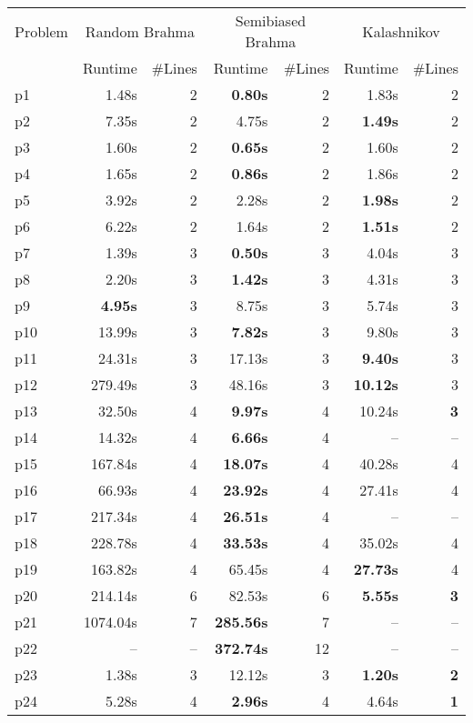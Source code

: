 \begin{tabular}{l||rr|rr|rr}
Problem & \multicolumn{2}{c}{Random {\sc Brahma}} & \multicolumn{2}{|c}{Semibiased {\sc Brahma}} & \multicolumn{2}{|c}{\sc Kalashnikov} \\
        & Runtime & \#Lines & Runtime & \#Lines & Runtime & \#Lines \\
\hline
\hline
p1 & 1.48s &2 &{\bf 0.80s} &2 &1.83s &2 \\
p2 & 7.35s &2 &4.75s &2 &{\bf 1.49s} &2 \\
p3 & 1.60s &2 &{\bf 0.65s} &2 &1.60s &2 \\
p4 & 1.65s &2 &{\bf 0.86s} &2 &1.86s &2 \\
p5 & 3.92s &2 &2.28s &2 &{\bf 1.98s} &2 \\
p6 & 6.22s &2 &1.64s &2 &{\bf 1.51s} &2 \\
p7 & 1.39s &3 &{\bf 0.50s} &3 &4.04s &3 \\
p8 & 2.20s &3 &{\bf 1.42s} &3 &4.31s &3 \\
p9 & {\bf 4.95s} &3 &8.75s &3 &5.74s &3 \\
p10 & 13.99s &3 &{\bf 7.82s} &3 &9.80s &3 \\
p11 & 24.31s &3 &17.13s &3 &{\bf 9.40s} &3 \\
p12 & 279.49s &3 &48.16s &3 &{\bf 10.12s} &3 \\
p13 & 32.50s &4 &{\bf 9.97s} &4 &10.24s &{\bf 3} \\
p14 & 14.32s &4 &{\bf 6.66s} &4 &-- &-- \\
p15 & 167.84s &4 &{\bf 18.07s} &4 &40.28s &4 \\
p16 & 66.93s &4 &{\bf 23.92s} &4 &27.41s &4 \\
p17 & 217.34s &4 &{\bf 26.51s} &4 &-- &-- \\
p18 & 228.78s &4 &{\bf 33.53s} &4 &35.02s &4 \\
p19 & 163.82s &4 &65.45s &4 &{\bf 27.73s} &4 \\
p20 & 214.14s &6 &82.53s &6 &{\bf 5.55s} &{\bf 3} \\
p21 & 1074.04s &7 &{\bf 285.56s} &7 &-- &-- \\
p22 & -- &-- &{\bf 372.74s} &12 &-- &-- \\
p23 & 1.38s &3 &12.12s &3 &{\bf 1.20s} &{\bf 2} \\
p24 & 5.28s &4 &{\bf 2.96s} &4 &4.64s &{\bf 1} \\
\end{tabular}
